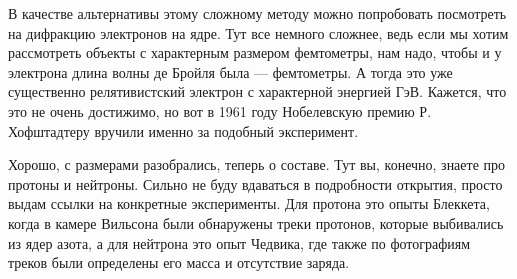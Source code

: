 \documentclass[12pt]{article}
\begin{document}
\vspace{1em} \noindent
В качестве альтернативы этому сложному методу можно попробовать посмотреть на дифракцию электронов на ядре. Тут все немного сложнее, ведь если мы хотим рассмотреть объекты с характерным размером фемтометры, нам надо, чтобы и у электрона длина волны де Бройля была --- фемтометры. А тогда это уже существенно релятивистский электрон с характерной энергией ГэВ. Кажется, что это не очень достижимо, но вот в 1961 году Нобелевскую премию Р. Хофштадтеру вручили именно за подобный эксперимент.

\vspace{1em} \noindent
Хорошо, с размерами разобрались, теперь о составе. Тут вы, конечно, знаете про протоны и нейтроны. Сильно не буду вдаваться в подробности открытия, просто выдам ссылки на конкретные эксперименты. Для протона это опыты Блеккета, когда в камере Вильсона были обнаружены треки протонов, которые выбивались из ядер азота, а для нейтрона это опыт Чедвика, где также по фотографиям треков были определены его масса и отсутствие заряда.
\end{document}

